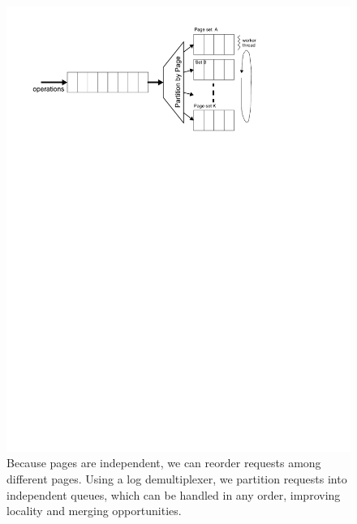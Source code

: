\documentclass[letterpaper,twocolumn,10pt]{article}
\begin{document}
\label{sec:logging}
\begin{figure}
\includegraphics[width=1\columnwidth]{figs/graph-traversal.pdf}
\vspace{-24pt}
\caption{\sf\label{fig:multiplexor} Because pages are independent, we
can reorder requests among different pages. Using a log demultiplexer,
we partition requests into independent queues, which can be 
handled in any order, improving locality and merging opportunities.}
\end{figure}
\end{document}
